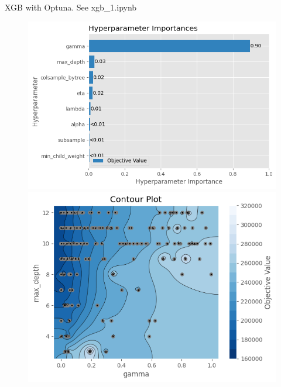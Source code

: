 \documentclass{beamer}
\begin{document}
\begin{frame}{\footnotesize XGB with Optuna. See xgb\_1.ipynb}
\begin{figure}
\begin{minipage}[t]{0.48\textwidth}
            \includegraphics[width=\linewidth]{figure/xgb_1_hyperImportance.png}
        \end{minipage}
        \begin{minipage}[t]{0.48\textwidth}
            \center
            \includegraphics[width=\linewidth]{figure/xgb_1_depth_gamma.png}
        \end{minipage}
    \end{figure}
\end{frame}
\end{document}
